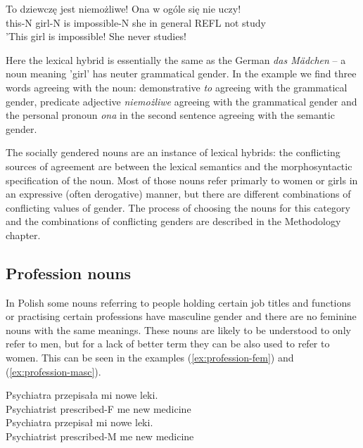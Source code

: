 \begin{exe}
  \ex\label{ex:gendered}
  \gll To dziewczę jest niemożliwe! Ona w ogóle się nie uczy!\\
  this-N girl-N is impossible-N she in general REFL not study\\
  \glt 'This girl is impossible! She never studies!
\end{exe}

Here the lexical hybrid is essentially the same as the German \textsl{das M{\"a}dchen} -- a noun meaning 'girl' has neuter grammatical gender. In the example we find three words agreeing with the noun: demonstrative \textsl{to} agreeing with the grammatical gender, predicate adjective \textsl{niemożliwe} agreeing with the grammatical gender and the personal pronoun \textsl{ona} in the second sentence agreeing with the semantic gender.

The socially gendered nouns are an instance of lexical hybrids: the conflicting sources of agreement are between the lexical semantics and the morphosyntactic specification of the noun. Most of those nouns refer primarly to women or girls in an expressive (often derogative) manner, but there are different combinations of conflicting values of gender. The process of choosing the nouns for this category and the combinations of conflicting genders are described in the Methodology chapter.

\subsection{Profession nouns}
In Polish some nouns referring to people holding certain job titles and functions or practising certain professions have masculine gender and there are no feminine nouns with the same meanings. These nouns are likely to be understood to only refer to men, but for a lack of better term they can be also used to refer to women. This can be seen in the examples (\ref{ex:profession-fem}) and (\ref{ex:profession-masc}).

\begin{exe}
  \ex\label{ex:profession-fem}
  \gll Psychiatra przepisała mi nowe leki.\\
  Psychiatrist prescribed-F me new medicine\\

  \ex\label{ex:profession-masc}
  \gll Psychiatra przepisał mi nowe leki.\\
  Psychiatrist prescribed-M me new medicine\\
\end{exe}

